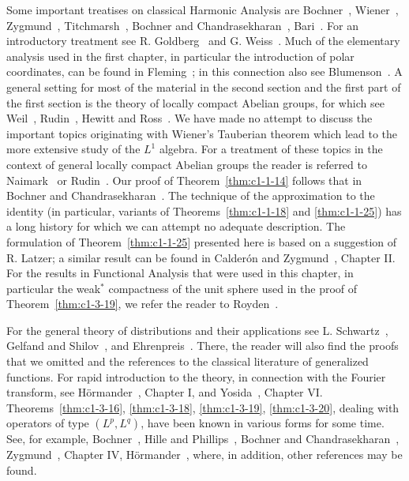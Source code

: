 \bibnoteshead

Some important treatises on classical Harmonic Analysis are
Bochner~\cite{Bochner3}, Wiener~\cite{Wiener1}, Zygmund~\cite{Zygmund1},
Titchmarsh~\cite{Titchmarsh2}, Bochner and
Chandrasekharan~\cite{BochnerChandrasekharan1}, Bari~\cite{Bari1}. For an
introductory treatment see R. Goldberg~\cite{Goldberg1} and
G. Weiss~\cite{Weiss3}. Much of the elementary analysis used in the first
chapter, in particular the introduction of polar coordinates, can be found in
Fleming~\cite{Fleming1}; in this connection also see
Blumenson~\cite{Blumenson1}. A general setting for most of the material in the
second section and the first part of the first section is the theory of locally
compact Abelian groups, for which see Weil~\cite{Weil1}, Rudin~\cite{Rudin1},
Hewitt and Ross~\cite{HewittRoss1}. We have made no attempt to discuss the
important topics originating with Wiener's Tauberian theorem which lead to the
more extensive study of the $L^{1}$ algebra. For a treatment of these topics in
the context of general locally compact Abelian groups the reader is referred
to Naimark~\cite{Naimark1} or Rudin~\cite{Rudin1}. Our proof of
Theorem~\ref{thm:c1-1-14} follows that in Bochner and
Chandrasekharan~\cite{BochnerChandrasekharan1}. The technique of the
approximation to the identity (in particular, variants of
Theorems~\ref{thm:c1-1-18} and \ref{thm:c1-1-25}) has a long history for which
we can attempt no adequate description. The formulation of
Theorem~\ref{thm:c1-1-25} presented here is based on a suggestion of R. Latzer;
a similar result can be found in Calder\'on and
Zygmund~\cite{CalderonZygmund3}, Chapter II. For the results in Functional
Analysis that were used in this chapter, in particular the weak$^{*}$ compactness
of the unit sphere used in the proof of Theorem~\ref{thm:c1-3-19}, we refer the
reader to Royden~\cite{Royden1}.

For the general theory of distributions and their applications see
L. Schwartz~\cite{Schwartz1}, Gelfand and Shilov~\cite{GelfandShilov1}, and
Ehrenpreis~\cite{Ehrenpreis1}. There, the reader will also find the proofs
that we omitted and the references to the classical literature of generalized
functions. For rapid introduction to the theory, in connection with the Fourier
transform, see H\"ormander~\cite{Hormander2}, Chapter I, and
Yosida~\cite{Yosida1}, Chapter VI. Theorems~\ref{thm:c1-3-16},
\ref{thm:c1-3-18}, \ref{thm:c1-3-19}, \ref{thm:c1-3-20}, dealing with operators
of type $(L^{p}, L^{q})$, have been known in various forms for some time. See,
for example, Bochner~\cite{Bochner9}, Hille and
Phillips~\cite{HillePhillips1}, Bochner and
Chandrasekharan~\cite{BochnerChandrasekharan1}, Zygmund~\cite{Zygmund1},
Chapter IV, H\"ormander~\cite{Hormander1}, where, in addition, other
references may be found.
